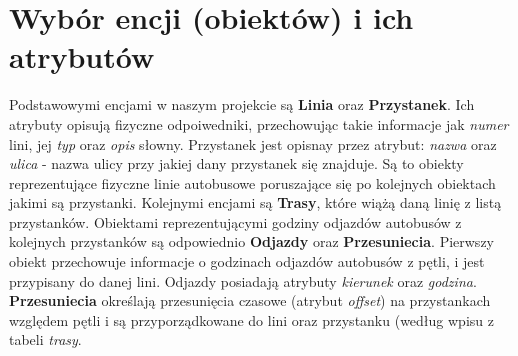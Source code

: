 \section{Wybór encji (obiektów) i ich atrybutów}

Podstawowymi encjami w naszym projekcie są \textbf{Linia} oraz \textbf{Przystanek}. 
Ich atrybuty opisują fizyczne odpoiwedniki, przechowując takie informacje jak \textit{numer}
lini, jej \textit{typ} oraz \textit{opis} słowny. Przystanek jest opisnay przez atrybut: 
\textit{nazwa} oraz \textit{ulica} - nazwa ulicy przy jakiej dany przystanek się znajduje.
Są to obiekty reprezentujące fizyczne linie autobusowe poruszające się po kolejnych 
obiektach jakimi są przystanki. Kolejnymi encjami są \textbf{Trasy}, które wiążą 
daną linię z listą przystanków. Obiektami reprezentującymi godziny odjazdów autobusów
z kolejnych przystanków są odpowiednio \textbf{Odjazdy} oraz \textbf{Przesuniecia}.
Pierwszy obiekt przechowuje informacje o godzinach odjazdów autobusów z pętli, i jest 
przypisany do danej lini. Odjazdy posiadają atrybuty \textit{kierunek} oraz \textit{godzina}.
\textbf{Przesuniecia} określają przesunięcia czasowe (atrybut \textit{offset}) na przystankach 
względem pętli i są przyporządkowane do lini oraz przystanku (według wpisu z tabeli \textit{trasy}.
